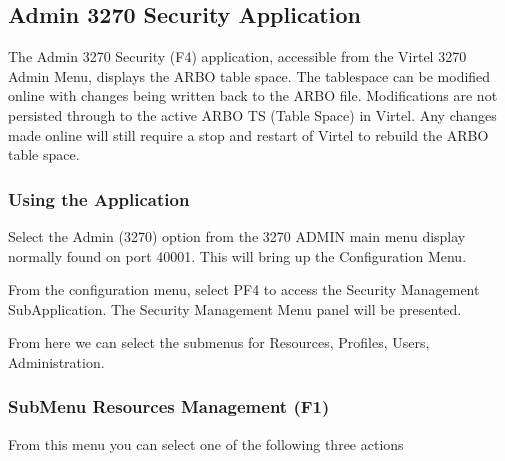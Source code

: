 \documentclass[letterpaper,10pt,english]{sphinxmanual}
\begin{document}
\newpage


\subsection{Admin 3270 Security Application}
\label{\detokenize{connectivity_guide:admin-3270-security-application}}
\sphinxAtStartPar
The Admin 3270 Security (F4) application, accessible from the Virtel 3270 Admin Menu, displays the ARBO table space. The tablespace can be modified online with changes being written back to the ARBO file. Modifications are not persisted through to the active ARBO TS (Table Space) in Virtel. Any changes made online will still require a stop and restart of Virtel to rebuild the ARBO table space.


\subsubsection{Using the Application}
\label{\detokenize{connectivity_guide:using-the-application}}
\sphinxAtStartPar
Select the Admin (3270) option from the 3270 ADMIN main menu display normally found on port 40001. This will bring up the Configuration Menu.

\sphinxAtStartPar
{}

\sphinxAtStartPar
From the configuration menu, select PF4 to access the Security Management Sub\sphinxhyphen{}Application. The Security Management Menu panel will be presented.

\sphinxAtStartPar
{}

\sphinxAtStartPar
From here we can select the sub\sphinxhyphen{}menus for Resources, Profiles, Users, Administration.


\subsubsection{Sub\sphinxhyphen{}Menu Resources Management (F1)}
\label{\detokenize{connectivity_guide:sub-menu-resources-management-f1}}
\sphinxAtStartPar
From this menu you can select one of the following three actions

\sphinxAtStartPar
{}

\sphinxAtStartPar
{}

\sphinxAtStartPar
{}
\end{document}
